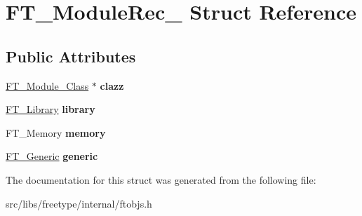 \hypertarget{struct_f_t___module_rec__}{
\section{FT\_\-ModuleRec\_\- Struct Reference}
\label{struct_f_t___module_rec__}
}
\subsection*{Public Attributes}
\begin{DoxyCompactItemize}
\item 
\hypertarget{struct_f_t___module_rec___ac762573dc13af2d2af190a9e855742f5}{
\hyperlink{struct_f_t___module___class__}{FT\_\-Module\_\-Class} $\ast$ {\bfseries clazz}}
\label{struct_f_t___module_rec___ac762573dc13af2d2af190a9e855742f5}

\item 
\hypertarget{struct_f_t___module_rec___ac3d04fbdc2988bf9a39f4ad6d3cb4b5f}{
\hyperlink{struct_f_t___library_rec__}{FT\_\-Library} {\bfseries library}}
\label{struct_f_t___module_rec___ac3d04fbdc2988bf9a39f4ad6d3cb4b5f}

\item 
\hypertarget{struct_f_t___module_rec___a33113e9eb2d6cd8ee6666da75ff8e108}{
FT\_\-Memory {\bfseries memory}}
\label{struct_f_t___module_rec___a33113e9eb2d6cd8ee6666da75ff8e108}

\item 
\hypertarget{struct_f_t___module_rec___a860be13b9f239c42cacdbc5d6f81d44a}{
\hyperlink{struct_f_t___generic__}{FT\_\-Generic} {\bfseries generic}}
\label{struct_f_t___module_rec___a860be13b9f239c42cacdbc5d6f81d44a}

\end{DoxyCompactItemize}


The documentation for this struct was generated from the following file:\begin{DoxyCompactItemize}
\item 
src/libs/freetype/internal/ftobjs.h\end{DoxyCompactItemize}
